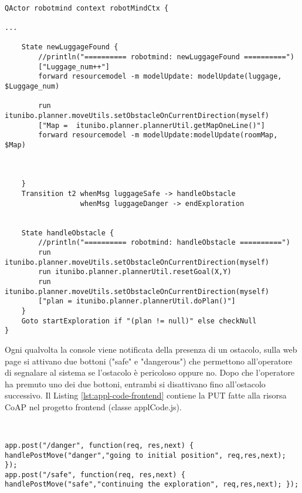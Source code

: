 \begin{lstlisting}[backgroundcolor=\color{white}, label={lst:robotmind-ddr-sys-6}, caption={"Codice di robotmind in ddrSystem6"}]

QActor robotmind context robotMindCtx {

...

    State newLuggageFound {
    	//println("========== robotmind: newLuggageFound ==========")
    	["Luggage_num++"]
    	forward resourcemodel -m modelUpdate: modelUpdate(luggage, $Luggage_num)
    
    	run itunibo.planner.moveUtils.setObstacleOnCurrentDirection(myself)
    	["Map =  itunibo.planner.plannerUtil.getMapOneLine()"]
    	forward resourcemodel -m modelUpdate:modelUpdate(roomMap, $Map)
    	
    	
    	
    }
    Transition t2 whenMsg luggageSafe -> handleObstacle
    			  whenMsg luggageDanger -> endExploration
    
    
    State handleObstacle {
    	//println("========== robotmind: handleObstacle ==========")
    	run itunibo.planner.moveUtils.setObstacleOnCurrentDirection(myself)
    	run itunibo.planner.plannerUtil.resetGoal(X,Y)
    	run itunibo.planner.moveUtils.setObstacleOnCurrentDirection(myself)
    	["plan = itunibo.planner.plannerUtil.doPlan()"]
    }
    Goto startExploration if "(plan != null)" else checkNull
}
\end{lstlisting}


Ogni qualvolta la console viene notificata della presenza di un ostacolo, sulla web page si attivano due bottoni ("safe" e "dangerous") che permettono all'operatore di segnalare al sistema se l'ostacolo è pericoloso oppure no. Dopo che l'operatore ha premuto uno dei due bottoni, entrambi si disattivano fino all'ostacolo successivo.
Il Listing \ref{lst:appl-code-frontend} contiene la PUT fatte alla risorsa CoAP nel progetto frontend (classe applCode.js).
\begin{lstlisting}[backgroundcolor=\color{white}, label={lst:appl-code-frontend}, caption={"Put alla risorsa CoAP nel progetto frontend"}]


app.post("/danger", function(req, res,next) { handlePostMove("danger","going to initial position", req,res,next); });
app.post("/safe", function(req, res,next) { handlePostMove("safe","continuing the exploration", req,res,next); });

\end{lstlisting}

